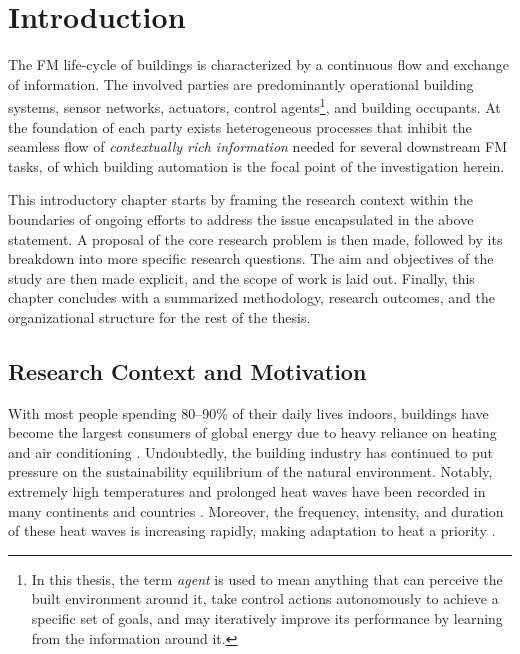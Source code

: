 \chapter{Introduction}
\label{chap:introduction}

The \ac{FM} life-cycle of buildings is characterized by a continuous flow and exchange of information. The involved parties are predominantly operational building systems, sensor networks, actuators, control agents\footnote{In this thesis, the term \textit{agent} is used to mean anything that can perceive the built environment around it, take control actions autonomously to achieve a specific set of goals, and may iteratively improve its performance by learning from the information around it. }, and building occupants. At the foundation of each party exists heterogeneous processes that inhibit the seamless flow of \textit{contextually rich information} needed for several downstream \ac{FM} tasks, of which building automation is the focal point of the investigation herein.

This introductory chapter starts by framing the research context within the boundaries of ongoing efforts to address the issue encapsulated in the above statement. A proposal of the core research problem is then made, followed by its breakdown into more specific research questions. The aim and objectives of the study are then made explicit, and the scope of work is laid out. Finally, this chapter concludes with a summarized methodology, research outcomes, and the organizational structure for the rest of the thesis.  

\section{Research Context and Motivation}
With most people spending 80–90\% of their daily lives indoors, buildings have become the largest consumers of global energy due to heavy reliance on heating and air conditioning \citep{ASHRAE2016GuidelineEnvironments, Mannan2021IndoorStructure}. Undoubtedly, the building industry has continued to put pressure on the sustainability equilibrium of the natural environment\citep{Dong2021GreenhouseCountries, Woods2022HumiditysConditioning}. Notably, extremely high temperatures and prolonged heat waves have been recorded in many continents and countries \citep{Somerville2012HeatChange, Akompab2013AwarenessAustralia, Junk2019FutureIndicators, Hopke2020ConnectingWildfires, Miller2021HeatOutput, Barriopedro2023HeatChallenges, Elia2024CouplingGradient}. Moreover, the frequency, intensity, and duration of these heat waves is increasing rapidly, making adaptation to heat a priority \citep{Peng2011TowardChange, Mitchell2016AttributingChange,  Baniassadi2018EnergyCodes, Alam2019BalancingDesign, Kriebel-Gasparro2022ClimateAdult}. 

